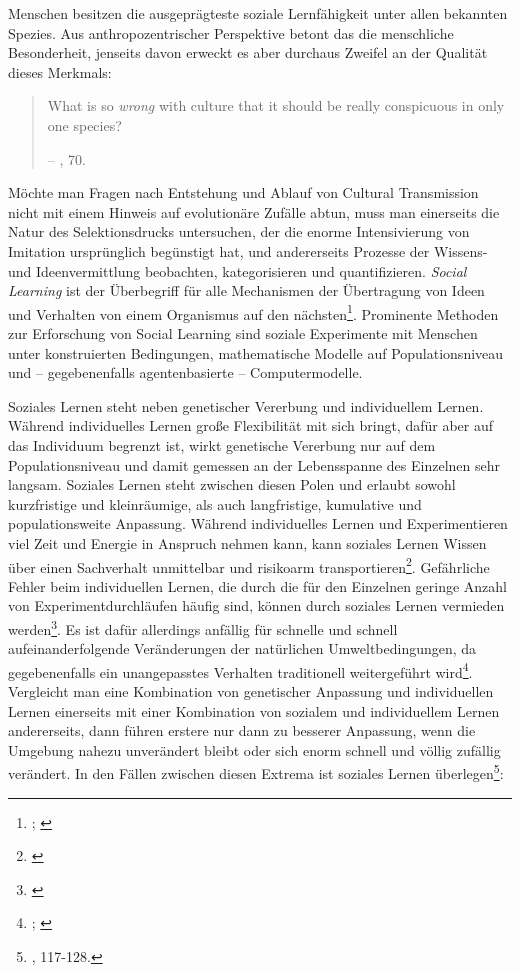 \documentclass[openany,twoside,twocolumn]{book}
\let\rmarkdownfootnote\footnote%
\def\footnote{\protect\rmarkdownfootnote}
\begin{document}
Menschen besitzen die ausgeprägteste soziale Lernfähigkeit unter allen
bekannten Spezies. Aus anthropozentrischer Perspektive betont das die
menschliche Besonderheit, jenseits davon erweckt es aber durchaus
Zweifel an der Qualität dieses Merkmals:

\begin{quote}
What is so \emph{wrong} with culture that it should be really
conspicuous in only one species?

-- \textcite{smith_cultural_1992}, 70.
\end{quote}

Möchte man Fragen nach Entstehung und Ablauf von Cultural Transmission
nicht mit einem Hinweis auf evolutionäre Zufälle abtun, muss man
einerseits die Natur des Selektionsdrucks untersuchen, der die enorme
Intensivierung von Imitation ursprünglich begünstigt hat, und
andererseits Prozesse der Wissens- und Ideenvermittlung beobachten,
kategorisieren und quantifizieren. \emph{Social Learning} ist der
Überbegriff für alle Mechanismen der Übertragung von Ideen und Verhalten
von einem Organismus auf den nächsten\footnote{\textcite{eerkens_cultural_2007};
  \textcite{rendell_cognitive_2011}}. Prominente Methoden zur
Erforschung von Social Learning sind soziale Experimente mit Menschen
unter konstruierten Bedingungen, mathematische Modelle auf
Populationsniveau und -- gegebenenfalls agentenbasierte --
Computermodelle.

Soziales Lernen steht neben genetischer Vererbung und individuellem
Lernen. Während individuelles Lernen große Flexibilität mit sich bringt,
dafür aber auf das Individuum begrenzt ist, wirkt genetische Vererbung
nur auf dem Populationsniveau und damit gemessen an der Lebensspanne des
Einzelnen sehr langsam. Soziales Lernen steht zwischen diesen Polen und
erlaubt sowohl kurzfristige und kleinräumige, als auch langfristige,
kumulative und populationsweite Anpassung. Während individuelles Lernen
und Experimentieren viel Zeit und Energie in Anspruch nehmen kann, kann
soziales Lernen Wissen über einen Sachverhalt unmittelbar und risikoarm
transportieren\footnote{\textcite{rendell_rogers_2010}}. Gefährliche
Fehler beim individuellen Lernen, die durch die für den Einzelnen
geringe Anzahl von Experimentdurchläufen häufig sind, können durch
soziales Lernen vermieden werden\footnote{\textcite{boyd_evolution_1988}}.
Es ist dafür allerdings anfällig für schnelle und schnell
aufeinanderfolgende Veränderungen der natürlichen Umweltbedingungen, da
gegebenenfalls ein unangepasstes Verhalten traditionell weitergeführt
wird\footnote{\textcite{rogers_does_1988}; \textcite{spencer_human_1993}}.
Vergleicht man eine Kombination von genetischer Anpassung und
individuellen Lernen einerseits mit einer Kombination von sozialem und
individuellem Lernen andererseits, dann führen erstere nur dann zu
besserer Anpassung, wenn die Umgebung nahezu unverändert bleibt oder
sich enorm schnell und völlig zufällig verändert. In den Fällen zwischen
diesen Extrema ist soziales Lernen überlegen\footnote{\textcite{boyd_culture_1985},
  117-128.}:
\end{document}

